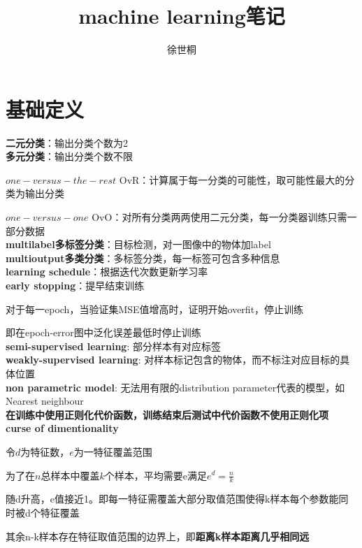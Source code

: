\documentclass[UTF8]{ctexart}
\title{machine learning笔记}
\author{徐世桐}
\date{}
\begin{document}
\maketitle

\section{基础定义}
\noindent \textbf{二元分类}：输出分类个数为2\\
\textbf{多元分类}：输出分类个数不限

  $one-versus-the-rest$ OvR：计算属于每一分类的可能性，取可能性最大的分类为输出分类

  $one-versus-one$ OvO：对所有分类两两使用二元分类，每一分类器训练只需一部分数据\\
\textbf{multilabel多标签分类}：目标检测，对一图像中的物体加label\\
\textbf{multioutput多类分类}：多标签分类，每一标签可包含多种信息\\
\textbf{learning schedule}：根据迭代次数更新学习率\\
\textbf{early stopping}：提早结束训练

  对于每一epoch，当验证集MSE值增高时，证明开始overfit，停止训练

  即在epoch-error图中泛化误差最低时停止训练\\
\textbf{semi-supervised learning}: 部分样本有对应标签\\
\textbf{weakly-supervised learning}: 对样本标记包含的物体，而不标注对应目标的具体位置\\
\textbf{non parametric model}: 无法用有限的distribution parameter代表的模型，如Nearest neighbour\\
\textbf{在训练中使用正则化代价函数，训练结束后测试中代价函数不使用正则化项}\\
\textbf{curse of dimentionality}

  令$d$为特征数，$e$为一特征覆盖范围

  为了在$n$总样本中覆盖$k$个样本，平均需要e满足$e^d = \frac{n}{k}$

  随d升高，e值接近1。即每一特征需覆盖大部分取值范围使得k样本每个参数能同时被d个特征覆盖

  其余n-k样本存在特征取值范围的边界上，即\textbf{距离k样本距离几乎相同远}

\end{document}
